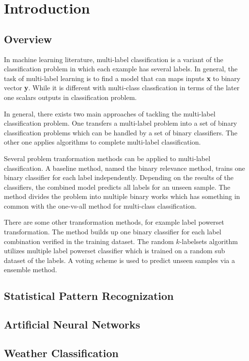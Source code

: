 
\chapter{Introduction} %
\label{Chapter5}


\section{Overview}

In machine learning literature, multi-label classification is a variant of the classification problem in which each example has several labels. In general, the task of multi-label learning is to find a model that can maps inputs \textbf{x} to binary vector \textbf{y}. While it is different with multi-class classfication in terms of the later one scalars outputs in classification problem.

In general, there exists two main approaches of tackling the multi-label classification problem. One transfers a multi-label problem into a set of binary classification problems which can be handled by a set of binary classifiers. The other one applies algorithms to complete multi-label classification. 

Several problem tranformation methods can be applied to multi-label classification. A baseline method, named the binary relevance method\citep{read2011classifier}, trains one binary classifier for each label independently. Depending on the results of the classifiers, the combined model predicts all labels for an unseen sample. The method divides the problem into multiple binary works which has something in common with the one-vs-all method for multi-class classification.

There are some other transformation methods, for example label powerset transformation. The method builds up one binary classifier for each label combination verified in the training dataset\citep{tsoumakas2006multi}. The random $k$-labelsets algorithm\citep{tsoumakas2007random} utilizes multiple label powerset classifier which is trained on a random sub dataset of the labels. A voting scheme is used to predict unseen samples via a ensemble method.

\section{Statistical Pattern Recognization}



\section{Artificial Neural Networks}



\section{Weather Classification}




